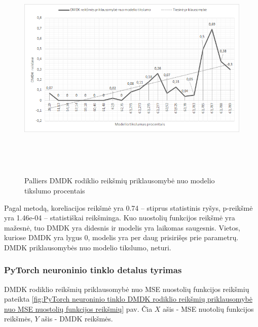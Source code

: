 \documentclass{VUMIFInfBakalaurinis}
\begin{document}
\begin{figure}[h]
  \centering
  \includegraphics[width=14cm,height=11cm,keepaspectratio]{img/pal_tyr_2.png}
  \caption{Palliers DMDK rodiklio reikšmių priklausomybė nuo modelio tikslumo procentais}
  \label{fig:Palliers DMDK rodiklio reikšmių priklausomybė nuo modelio tikslumo procentais}
\end{figure}

\par Pagal  metodą, koreliacijos reikšmė yra 0.74 -- stiprus statistinis ryšys, p-reikšmė yra 1.46e-04 -- statistiškai reikšminga. Kuo nuostolių funkcijos reikšmė yra mažesnė, tuo DMDK yra didesnis ir modelis yra laikomas saugesnis. Vietos, kuriose DMDK yra lygus 0, modelis yra per daug prisirišęs prie parametrų. DMDK priklausomybės nuo modelio tikslumo, neturi.

\subsubsection{PyTorch neuroninio tinklo detalus tyrimas}
\par DMDK rodiklio reikšmių priklausomybė nuo MSE nuostolių funkcijos reikšmių pateikta \ref{fig:PyTorch neuroninio tinklo DMDK rodiklio reikšmių priklausomybė nuo MSE nuostolių funkcijos reikšmių} pav. Čia $X$ ašis - MSE nuotolių funkcijos reikšmės, $Y$ ašis - DMDK reikšmės. 
\end{document}
